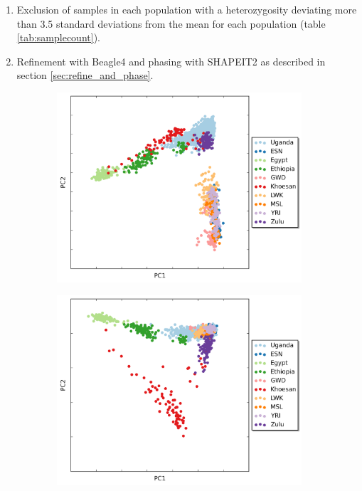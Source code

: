 \begin{enumerate}
\item{Exclusion of samples in each population with a heterozygosity deviating more than 3.5 standard deviations from the mean for each population (table \ref{tab:samplecount}).}

\item{Refinement with Beagle4 and phasing with SHAPEIT2 as described in section \ref{sec:refine_and_phase}.}

\end{enumerate}

\begin{figure}[h]
\begin{subfigure}{.5\textwidth}
  \centering
  \includegraphics[width=1.0\linewidth]{ADRP/figures/PC12_africa_noVR.png}
  \caption{}
\end{subfigure}%
\begin{subfigure}{.5\textwidth}
  \centering
  \includegraphics[width=1.0\linewidth]{ADRP/figures/PC12_africa}

\end{subfigure}
\end{figure}
